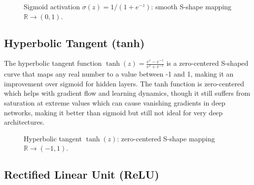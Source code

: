 \begin{figure}[htbp]
\centering
{}
\caption{Sigmoid activation $\sigma(z)=1/(1+e^{-z})$: smooth S-shape mapping $\mathbb{R}\to(0,1)$.}
\label{fig:sigmoid-plot}
\end{figure}

\subsection{Hyperbolic Tangent (tanh)}

The hyperbolic tangent function $\tanh(z) = \frac{e^z - e^{-z}}{e^z + e^{-z}}$ is a zero-centered S-shaped curve that maps any real number to a value between -1 and 1, making it an improvement over sigmoid for hidden layers. The tanh function is zero-centered which helps with gradient flow and learning dynamics, though it still suffers from saturation at extreme values which can cause vanishing gradients in deep networks, making it better than sigmoid but still not ideal for very deep architectures.

\begin{figure}[htbp]
\centering
{}
\caption{Hyperbolic tangent $\tanh(z)$: zero-centered S-shape mapping $\mathbb{R}\to(-1,1)$.}
\label{fig:tanh-plot}
\end{figure}

\subsection{Rectified Linear Unit (ReLU)}

